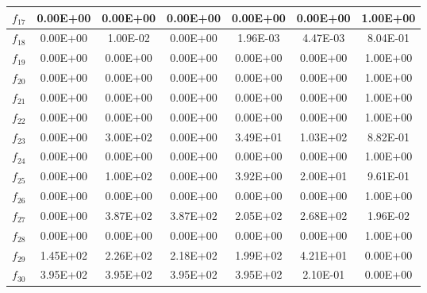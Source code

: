 \begin{table}[!t]
\begin{scriptsize}
\begin{tabular}{|c|c|c|c|c|c|c|}
$f_{17}$ & 0.00E+00 & 0.00E+00 & 0.00E+00 & 0.00E+00 & 0.00E+00 & 1.00E+00 \\ \hline
$f_{18}$ & 0.00E+00 & 1.00E-02 & 0.00E+00 & 1.96E-03 & 4.47E-03 & 8.04E-01 \\ \hline
$f_{19}$ & 0.00E+00 & 0.00E+00 & 0.00E+00 & 0.00E+00 & 0.00E+00 & 1.00E+00 \\ \hline
$f_{20}$ & 0.00E+00 & 0.00E+00 & 0.00E+00 & 0.00E+00 & 0.00E+00 & 1.00E+00 \\ \hline
$f_{21}$ & 0.00E+00 & 0.00E+00 & 0.00E+00 & 0.00E+00 & 0.00E+00 & 1.00E+00 \\ \hline
$f_{22}$ & 0.00E+00 & 0.00E+00 & 0.00E+00 & 0.00E+00 & 0.00E+00 & 1.00E+00 \\ \hline
$f_{23}$ & 0.00E+00 & 3.00E+02 & 0.00E+00 & 3.49E+01 & 1.03E+02 & 8.82E-01 \\ \hline
$f_{24}$ & 0.00E+00 & 0.00E+00 & 0.00E+00 & 0.00E+00 & 0.00E+00 & 1.00E+00 \\ \hline
$f_{25}$ & 0.00E+00 & 1.00E+02 & 0.00E+00 & 3.92E+00 & 2.00E+01 & 9.61E-01 \\ \hline
$f_{26}$ & 0.00E+00 & 0.00E+00 & 0.00E+00 & 0.00E+00 & 0.00E+00 & 1.00E+00 \\ \hline
$f_{27}$ & 0.00E+00 & 3.87E+02 & 3.87E+02 & 2.05E+02 & 2.68E+02 & 1.96E-02 \\ \hline
$f_{28}$ & 0.00E+00 & 0.00E+00 & 0.00E+00 & 0.00E+00 & 0.00E+00 & 1.00E+00 \\ \hline
$f_{29}$ & 1.45E+02 & 2.26E+02 & 2.18E+02 & 1.99E+02 & 4.21E+01 & 0.00E+00 \\ \hline
$f_{30}$ & 3.95E+02 & 3.95E+02 & 3.95E+02 & 3.95E+02 & 2.10E-01 & 0.00E+00 \\ \hline
\end{tabular}%
\end{scriptsize}
\end{table}

